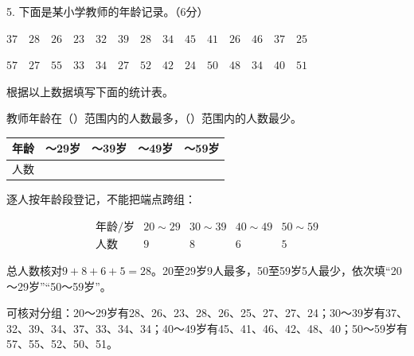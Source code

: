 5. 下面是某小学教师的年龄记录。（6分）\par \(37\quad28\quad26\quad23\quad32\quad39\quad28\quad34\quad45\quad41\quad26\quad46\quad37\quad25\)\par \(57\quad27\quad55\quad33\quad34\quad27\quad52\quad42\quad24\quad50\quad48\quad34\quad40\quad51\)\par 根据以上数据填写下面的统计表。\par 教师年龄在（\hspace{1.8em}）范围内的人数最多，（\hspace{1.8em}）范围内的人数最少。\par
\par\smallskip{}\begingroup\small\setlength{\tabcolsep}{3pt}
\noindent\begin{tabularx}{\linewidth}{|*{5}{>{\centering\arraybackslash}X|}}\hline
年龄 & 20～29岁 & 30～39岁 & 40～49岁 & 50～59岁\\\hline
人数 &  &  &  & \\\hline
\end{tabularx}\par
\endgroup\smallskip
\begin{BookAnswer}
逐人按年龄段登记，不能把端点跨组：\par \[\begin{array}{c|rrrr}\text{年龄/岁}&20\sim29&30\sim39&40\sim49&50\sim59\\\hline\text{人数}&9&8&6&5\end{array}\]\par 总人数核对\(9+8+6+5=28\)。20至29岁9人最多，50至59岁5人最少，依次填“20～29岁”“50～59岁”。\par 可核对分组：20～29岁有28、26、23、28、26、25、27、27、24；30～39岁有37、32、39、34、37、33、34、34；40～49岁有45、41、46、42、48、40；50～59岁有57、55、52、50、51。
\end{BookAnswer}
